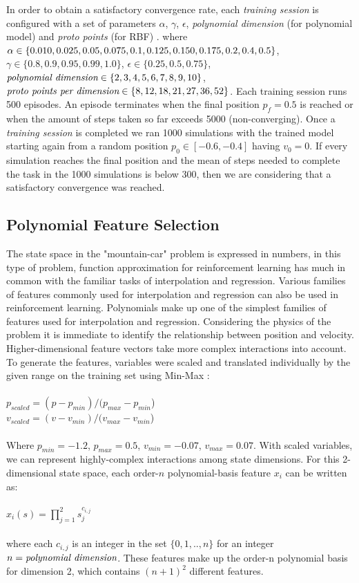\documentclass[10pt,twocolumn]{article}
\begin{document}
In order to obtain a satisfactory convergence rate, each \emph{training session} is configured with a set of parameters $\alpha$, $\gamma$, $\epsilon$, \emph{polynomial dimension} (for polynomial model) and \emph{proto points} (for RBF)
. where $\alpha \in \{0.010, 0.025, 0.05, 0.075, 0.1, 0.125, 0.150, 0.175, 0.2, 0.4,\\ 0.5\}$, $\gamma \in \{0.8, 0.9, 0.95, 0.99, 1.0\}$,
 $\epsilon \in \{0.25, 0.5, 0.75\}$, $\emph{polynomial dimension} \in \{2, 3, 4, 5, 6, 7, 8, 9, 10\}$, $\emph{proto points per dimension} \in \{8, 12, 18, 21, 27, 36, 52\}$. 
 Each training session runs 500 episodes. An episode terminates when the final position $p_{f} = 0.5$ is reached or when the amount of steps taken so far exceeds 5000 (non-converging).
 Once a \emph{training session} is completed we ran 1000 simulations with the trained model starting again from a random position $p_{0}\in[-0.6,-0.4]$ having $v_{0} = 0$. 
 If every simulation reaches the final position and the mean of steps needed to complete the task in the 1000 simulations is below 300, then we are considering that
  a satisfactory convergence was reached. 

\subsection{Polynomial Feature Selection}
The state space in the "mountain-car" problem is expressed in numbers, in this type of problem, function approximation for reinforcement
learning has much in common with the familiar tasks of interpolation and regression. Various families of features commonly used 
for interpolation and regression can also be used in reinforcement learning. Polynomials make up one of the simplest families of
features used for interpolation and regression. \cite{Sutton1998} Considering the physics of the problem it is immediate to identify
the relationship between position and velocity. Higher-dimensional feature vectors take more complex interactions into account.
To generate the features, variables were scaled and translated individually by the given range on the training set using Min-Max \cite{Normalization}:
\\ \\
$p_{scaled} = (p - p_{min}) / (p_{max} - p_{min}$)
\\
$v_{scaled} = (v - v_{min}) / (v_{max} - v_{min}$)
\\ \\
Where $p_{min} = -1.2$, $p_{max} = 0.5$, $v_{min} = -0.07$, $v_{max} = 0.07$. With scaled variables, we can represent highly-complex interactions among state
dimensions. For this 2-dimensional state space, each order-$n$ polynomial-basis feature $x_i$ can be written as:
\\ \\
$x_{i}(s) = \prod_{j=1}^{2} s_{j}^{c_{i,j}}$
\\ \\
where each $c_{i,j}$ is an integer in the set $\{0, 1, .. , n\}$ for an integer $n = \emph{polynomial dimension}$. These
features make up the order-n polynomial basis for dimension 2, which contains $(n + 1)^2$ different features. \cite{Sutton1998}
\end{document}
